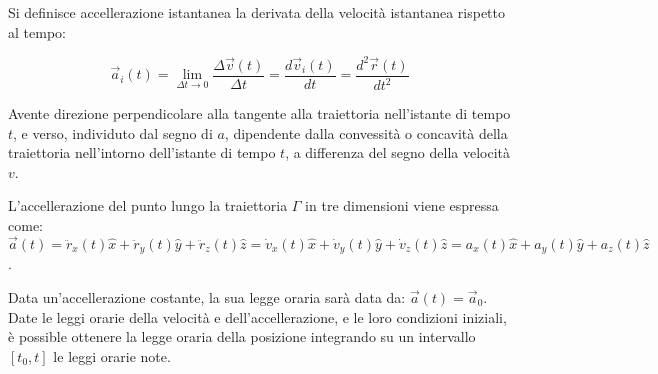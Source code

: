 \documentclass{article}
\numberwithin{equation}{subsection}
\begin{document}
Si definisce accellerazione istantanea la derivata della velocità istantanea rispetto al tempo: 

\begin{equation}
    \vec{a}_i(t) = \lim_{\Delta t \to 0}\displaystyle\frac{\Delta\vec{v}(t)}{\Delta t} = \displaystyle\frac{d\vec{v}_i(t)}{dt} = \displaystyle\frac{d^{2}\vec{r}(t)}{dt^{2}}
\end{equation}

Avente direzione perpendicolare alla tangente alla 
traiettoria nell'istante di tempo $t$, e verso, individuto dal segno di $a$, dipendente dalla convessità o concavità della traiettoria
nell'intorno dell'istante di tempo $t$, a differenza del segno della velocità $v$. 


L'accellerazione del punto lungo la traiettoria $\Gamma$ in tre dimensioni viene espressa come:
$\vec{a}(t) = \ddot{r}_x(t)\hat{x} +\ddot{r}_y(t)\hat{y} +\ddot{r}_z(t)\hat{z} = \dot{v}_x(t)\hat{x} + \dot{v}_y(t)\hat{y} + \dot{v}_z(t)\hat{z} = a_x(t)\hat{x} +a_y(t)\hat{y} + a_z(t)\hat{z}$.

\begin{center}\end{center}

Data un'accellerazione costante, la sua legge oraria sarà data 
da: $\vec{a}(t) = \vec{a}_0$. 
Date le leggi orarie della velocità e dell'accellerazione, e le loro condizioni iniziali, è possible ottenere la legge 
oraria della posizione integrando su un intervallo $[t_0,t]$ le leggi orarie note. 
\end{document}
